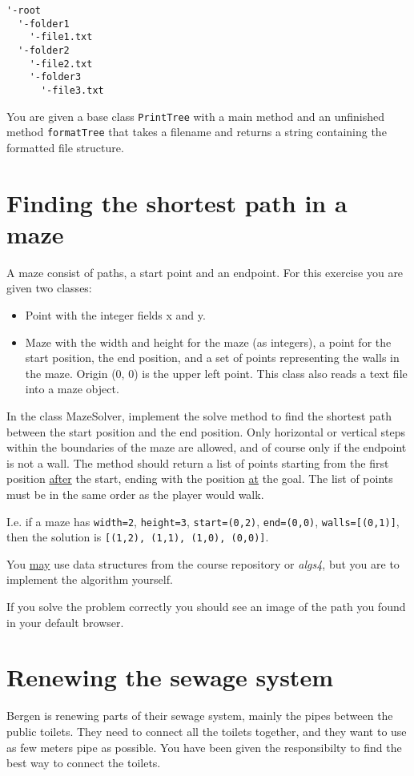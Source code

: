 \documentclass[11pt]{article}
\begin{document}
    \begin{lstlisting}[frame=single]
'-root
  '-folder1
    '-file1.txt
  '-folder2
    '-file2.txt
    '-folder3
      '-file3.txt
    \end{lstlisting}

    You are given a base class \texttt{PrintTree} with a main method and an unfinished method \texttt{formatTree} that takes a filename and returns a string containing the formatted file structure.


    \section{Finding the shortest path in a maze}
    A maze consist of paths, a start point and an endpoint. For this exercise you are given two classes:
    \begin{itemize}
      \item Point with the integer fields x and y.
      \item Maze with the width and height for the maze (as integers), a point for the start position, the end position, and a set of points representing the walls in the maze. Origin (0, 0) is the upper left point. This class also reads a text file into a maze object.
    \end{itemize}

    In the class MazeSolver, implement the solve method to find the shortest path between the start position and the end position. Only horizontal or vertical steps within the boundaries of the maze are allowed, and of course only if the endpoint is not a wall. The method should return a list of points starting from the first position \underline{after} the start, ending with the position \underline{at} the goal. The list of points must be in the same order as the player would walk.

    I.e. if a maze has \texttt{width=2}, \texttt{height=3}, \texttt{start=(0,2)}, \texttt{end=(0,0)}, \texttt{walls=[(0,1)]}, then the solution is \texttt{[(1,2), (1,1), (1,0), (0,0)]}.

    You \underline{may} use data structures from the course repository or \textit{algs4}, but you are to implement the algorithm yourself.

    If you solve the problem correctly you should see an image of the path you found in your default browser.

    \section{Renewing the sewage system}
    Bergen is renewing parts of their sewage system, mainly the pipes between the public toilets. They need to connect all the toilets together, and they want to use as few meters pipe as possible. You have been given the responsibilty to find the best way to connect the toilets.
\end{document}
